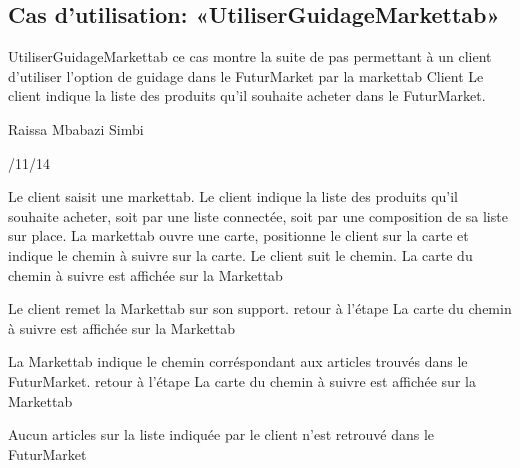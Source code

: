 \subsection{Cas d'utilisation: «UtiliserGuidageMarkettab» }

\startCU
\nom UtiliserGuidageMarkettab
\but  ce cas montre la suite de pas permettant à un client d'utiliser l'option de guidage dans le FuturMarket par la markettab
\acteur Client
\precondition Le client indique la liste des produits qu'il souhaite acheter dans le FuturMarket.

\auteur Raissa Mbabazi Simbi
\date 7/11/14

\nominal %
\startnominal
\etape[RETOUR1] Le client saisit une markettab. 
\etape Le client indique la liste des produits qu'il souhaite acheter, soit par une liste connectée, soit par une composition de sa liste sur place.
\etape[SE1]  La markettab ouvre une carte, positionne le client sur la carte et indique le chemin à suivre sur la carte.
\etape [RETOUR2]Le client suit le chemin.
\stopnominal
\postcondition La carte du chemin à suivre est affichée sur la Markettab

\alternatifs
\startalternatif
{} 
  \etape Le client remet la Markettab sur son support.
  \etape retour à l'étape \in[RETOUR1]
\stopcondition
\postcondition La carte du chemin à suivre est affichée sur la Markettab
\stopalternatif

\startalternatif[SE1]
   \etape  La Markettab indique le chemin corréspondant aux articles trouvés dans le FuturMarket.
  \etape retour à l'étape \in[RETOUR2]
\stopcondition
\postcondition La carte du chemin à suivre est affichée sur la Markettab
\stopalternatif


\exception
Aucun articles sur la liste indiquée par le client n'est retrouvé dans le FuturMarket
\stopCU
